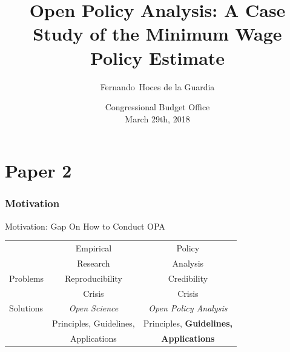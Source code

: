 \documentclass{beamer}
\def\white{\color{white}}
\begin{document}
\part{Paper 2}
\title[OPA - Minimum Wage ] %
{Open Policy Analysis: A Case Study of the Minimum Wage Policy Estimate}

\subtitle
{}

\author[] %
{Fernando~Hoces de la Guardia}


\date[] %
{Congressional Budget Office\\
March 29th, 2018}



\begin{frame}
  \titlepage
\end{frame}

\section{Motivation}

\begin{frame}[noframenumbering]{Motivation: Gap On How to Conduct OPA}
\begin{table}[ht]
\centering
\begin{tabular}[t]{|l|c|c|}
\hline
& Empirical  & Policy \\
& Research & Analysis \\

\hline
Problems & Reproducibility  &  Credibility \\
				 &  Crisis & Crisis \\
\hline
Solutions &  \textit{Open Science}&    \textit{Open Policy Analysis} \\
 & Principles, Guidelines,  &   Principles{\white, \textbf{Guidelines,}}\\
 & Applications &   {\white \textbf{Applications}}\\

\hline
\end{tabular}
\end{table}%
\end{frame}
\end{document}
